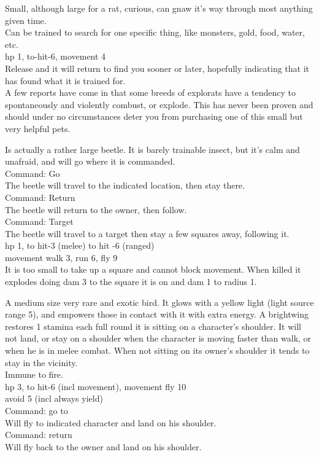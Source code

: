 Small, although large for a rat, curious, can gnaw it's way through most anything given time. \\
Can be trained to search for one specific thing, like monsters, gold, food, water, etc.\\
hp 1, to-hit-6, movement 4 \\
Release and it will return to find you sooner or later, hopefully indicating that it has found what it is trained for. \\
A few reports have come in that some breeds of explorats have a tendency to spontaneously and violently combust, or explode. This has never been proven and should under no circumstances deter you from purchasing one of this small but very helpful pets.


Is actually a rather large beetle. It is barely trainable insect, but it's calm and unafraid, and will go where it is commanded. \\
Command: Go \\
The beetle will travel to the indicated location, then stay there. \\
Command: Return \\
The beetle will return to the owner, then follow. \\
Command: Target \\
The beetle will travel to a target then stay a few squares away, following it.\\
hp 1, to hit-3 (melee) to hit -6 (ranged) \\
movement walk 3, run 6, fly 9 \\
It is too small to take up a square and cannot block movement. When killed it explodes doing dam 3 to the square it is on and dam 1 to radius 1.


A medium size very rare and exotic bird. It glows with a yellow light (light source range 5), and empowers those in contact with it with extra energy. A brightwing restores 1 stamina each full round it is sitting on a character's shoulder. It will not land, or stay on a shoulder when the character is moving faster than walk, or when he is in melee combat. When not sitting on its owner's shoulder it tends to stay in the vicinity. \\
Immune to fire. \\
hp 3, to hit-6 (incl movement), movement fly 10 \\
avoid 5 (incl always yield) \\
Command: go to \\
Will fly to indicated character and land on his shoulder. \\
Command: return \\
Will fly back to the owner and land on his shoulder.


